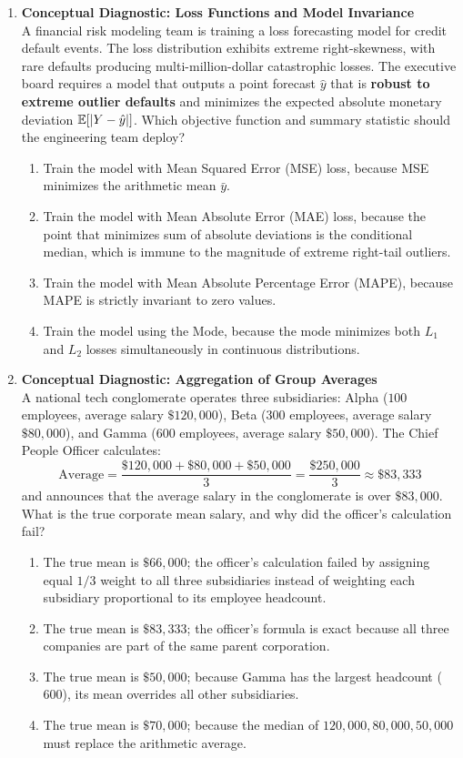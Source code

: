 \begin{enumerate}[resume]
\item \textbf{Conceptual Diagnostic: Loss Functions and Model Invariance} \\
A financial risk modeling team is training a loss forecasting model for credit default events. The loss distribution exhibits extreme right-skewness, with rare defaults producing multi-million-dollar catastrophic losses. The executive board requires a model that outputs a point forecast $\hat{y}$ that is \textbf{robust to extreme outlier defaults} and minimizes the expected absolute monetary deviation $\mathbb{E}[|Y - \hat{y}|]$. Which objective function and summary statistic should the engineering team deploy?
\begin{enumerate}
    \item Train the model with Mean Squared Error (MSE) loss, because MSE minimizes the arithmetic mean $\bar{y}$.
    \item Train the model with Mean Absolute Error (MAE) loss, because the point that minimizes sum of absolute deviations is the conditional median, which is immune to the magnitude of extreme right-tail outliers.
    \item Train the model with Mean Absolute Percentage Error (MAPE), because MAPE is strictly invariant to zero values.
    \item Train the model using the Mode, because the mode minimizes both $L_1$ and $L_2$ losses simultaneously in continuous distributions.
\end{enumerate}

\item \textbf{Conceptual Diagnostic: Aggregation of Group Averages} \\
A national tech conglomerate operates three subsidiaries: Alpha ($100$ employees, average salary $\$120{,}000$), Beta ($300$ employees, average salary $\$80{,}000$), and Gamma ($600$ employees, average salary $\$50{,}000$). The Chief People Officer calculates:
$$\text{Average} = \frac{\$120{,}000 + \$80{,}000 + \$50{,}000}{3} = \frac{\$250{,}000}{3} \approx \$83{,}333$$
and announces that the average salary in the conglomerate is over $\$83{,}000$. What is the true corporate mean salary, and why did the officer's calculation fail?
\begin{enumerate}
    \item The true mean is $\$66{,}000$; the officer's calculation failed by assigning equal $1/3$ weight to all three subsidiaries instead of weighting each subsidiary proportional to its employee headcount.
    \item The true mean is $\$83{,}333$; the officer's formula is exact because all three companies are part of the same parent corporation.
    \item The true mean is $\$50{,}000$; because Gamma has the largest headcount ($600$), its mean overrides all other subsidiaries.
    \item The true mean is $\$70{,}000$; because the median of $120{,}000, 80{,}000, 50{,}000$ must replace the arithmetic average.
\end{enumerate}
\end{enumerate}
